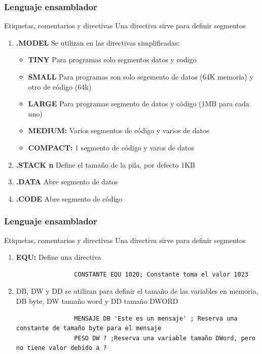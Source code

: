 \documentclass{beamer}
\begin{document}
\begin{frame}
	\frametitle{Lenguaje ensamblador}
	\begin{block}{Etiquetas, comentarios y directivas}
		Una directiva sirve para definir segmentos
			\begin{enumerate}
				\item \textbf{.MODEL} Se utilizan en las directivas simplificadas: 
				\begin{itemize}
					\item \textbf{TINY} Para programas solo segmentos datos y codigo
					\item \textbf{SMALL} Para programas son solo segemento de datos (64K memoria) y otro de código (64k)
					\item \textbf{LARGE} Para programas segmento de datos y código (1MB para cada uno)
					\item \textbf{MEDIUM:} Varios segmentos de código y varios de datos
					\item \textbf{COMPACT:} 1 segmento de código y varos de datos
				\end{itemize}
				\item \textbf{.STACK n} Define el tamaño de la pila, por defecto 1KB
				\item \textbf{.DATA} Abre segmento de datos
				\item \textbf{.CODE} Abre segmento de código
			\end{enumerate}
	\end{block}
\end{frame}

\begin{frame}[fragile]
	\frametitle{Lenguaje ensamblador}
	\begin{block}{Etiquetas, comentarios y directivas}
		Una directiva sirve para definir segmentos
		\begin{enumerate}
			\item \textbf{EQU:} Define una directiva
				\begin{lstlisting}
				CONSTANTE EQU 1020; Constante toma el valor 1023
				\end{lstlisting}				
			\item DB, DW y DD se utilizan para definir el tamaño de las variables en memoria, DB byte, DW tamaño word y DD tamaño DWORD
			\begin{lstlisting}
				MENSAJE DB 'Este es un mensaje' ; Reserva una constante de tamaño byte para el mensaje
				PESO DW ? ;Reserva una variable tamaño DWord, pero no tiene valor debido a ?
			\end{lstlisting}	
		\end{enumerate}
	\end{block}
\end{frame}
\end{document}
